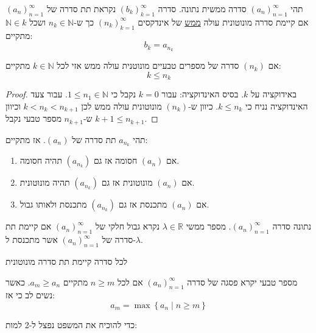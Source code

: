 \documentclass{tstextbook}
\begin{document}
\begin{definition}[תת סדרה]
תהי \((a_n)_{n=1}^\infty\) סדרה ממשית נתונה. סדרה \((b_k)_{k=1}^\infty\) נקראת תת סדרה של \((a_n)_{n=1}^\infty\) אם קיימת סדרה מונוטונית עולה \underline{ממש}
של אינדקסים \((n_{k})_{k=1}^\infty\) כך ש-\(n_{k}\in \mathbb{N}\) ושכל \(\mathbb{N}\in k\) מתקיים:
$$b_{k}=a_{n_{k}}$$

\end{definition}
\begin{proposition}
אם \((n_{k})\) סדרה של מספרים טבעיים מונוטנית עולה ממש אזי לכל \(k \in \mathbb{N}\) מתקיים:
$$k\leq n_{k}$$

\end{proposition}
\begin{proof}
באידוקציה על \(k\). בסיס האינדוקציה: עבור \(k=0\) נקבל כי \(1\leq n_{1}\in \mathbb{N}\).
עבור צעד האינדוקציה נניח כי \(k\leq n_{k}\). כיוון ש-\((n_{k})\) מונוטונית עולה ממש לכן \(k<n_{k}<n_{k+1}\) וכיוון ש-\(n_{k+1}\) מספר טבעי נקבל \(k+1\leq n_{k+1}\).

\end{proof}
\begin{theorem}[ירושה]
תהי \(a_{n_{k}}\) תת סדרה של \((a_{n})\). אז מתקיים:

\end{theorem}
\begin{enumerate}
  \item אם \((a_{n})\) חסומה אז גם \((a_{n_{k}})\) תהיה חסומה. 


  \item אם \((a_{n})\) מונוטונית אז גם \((a_{n_{k}})\) תהיה מונוטונית. 


  \item אם \((a_{n})\) מתכנסת אז גם \((a_{n_{k}})\) מתכנסת ולאותו גבול. 


\end{enumerate}
\begin{definition}
נתונה סדרה \((a_n)_{n=1}^\infty\). מספר ממשי \(\lambda \in \mathbb{R}\) נקרא גבול חלקי של \((a_n)_{n=1}^\infty\) אם קיימת תת סדרה של \((a_n)_{n=1}^\infty\) אשר מתכנסת ל-\(\lambda\).

\end{definition}
\begin{proposition}
לכל סדרה קיימת תת סדרה מונוטונית

\end{proposition}
\begin{definition}[פסגה]
מספר טבעי יקרא פסגה של סדרה \((a_n)_{n=1}^\infty\) אם לכל \(n\geq m\) מתקיים \(a_{m}\geq a_{n}\). כאשר נשים לב כי אז:
$$a_{m}=\max \left\{  a_{n}\mid n\geq m  \right\}$$

\end{definition}
כדי להוכיח את המשפט נפצל ל-2 למות:
\end{document}
